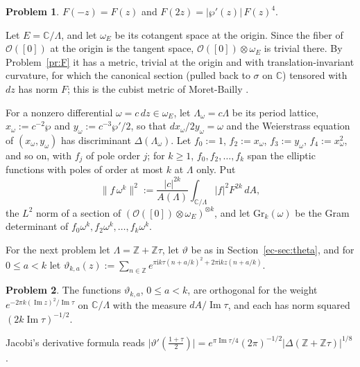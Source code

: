 \documentclass[reqno]{amsart}
\theoremstyle{definition}
\newtheorem{problem}{Problem}[section]
\theoremstyle{plain}
\newcommand{\Z}{\mathbb{Z}}
\newcommand{\C}{\mathbb{C}}
\newcommand{\Oc}{\mathcal{O}}
\newcommand{\ii}{\mathrm{i}}
\begin{document}
\begin{problem}\label{pr:F-dup}
\(F(-z) = F(z)\) and \(F(2z) = \lvert\wp'(z)\rvert\, F(z)^4\).
\end{problem}

Let \(E = \C/\Lambda\), and let \(\omega_E\) be its cotangent space at the origin.  Since the fiber of \(\Oc([0])\) at the origin is the tangent space, \(\Oc([0]) \otimes \omega_E\) is trivial there.  By Problem~\ref{pr:F} it has a metric, trivial at the origin and with translation-invariant curvature, for which the canonical section (pulled back to \(\sigma\) on \(\C\)) tensored with \(dz\) has norm \(F\); this is the cubist metric of Moret-Bailly \cite{MB85}.

For a nonzero differential \(\omega = c\,dz \in \omega_E\), let \(\Lambda_\omega = c\Lambda\) be its period lattice, \(x_\omega := c^{-2}\wp\) and \(y_\omega := c^{-3}\wp'/2\), so that \(dx_\omega/2y_\omega = \omega\) and the Weierstrass equation of \((x_\omega, y_\omega)\) has discriminant \(\Delta(\Lambda_\omega)\).  Let \(f_0 := 1\), \(f_2 := x_\omega\), \(f_3 := y_\omega\), \(f_4 := x_\omega^2\), and so on, with \(f_j\) of pole order \(j\); for \(k \ge 1\), \(f_0, f_2, \dots, f_k\) span the elliptic functions with poles of order at most \(k\) at \(\Lambda\) only.  Put
\[
  \lVert f\,\omega^{k} \rVert^2 := \frac{\lvert c \rvert^{2k}}{A(\Lambda)} \int_{\C/\Lambda} \lvert f \rvert^2 F^{2k} \, dA ,
\]
the \(L^2\) norm of a section of \((\Oc([0]) \otimes \omega_E)^{\otimes k}\), and let \(\mathrm{Gr}_k(\omega)\) be the Gram determinant of \(f_0\omega^k, f_2\omega^k, \dots, f_k\omega^k\).

For the next problem let \(\Lambda = \Z + \Z\tau\), let \(\vartheta\) be as in Section~\ref{ec-sec:theta}, and for \(0 \le a < k\) let \(\vartheta_{k,a}(z) := \sum_{n \in \Z} e^{\pi\ii k\tau(n + a/k)^2 + 2\pi\ii k z(n + a/k)}\).

\begin{problem}\label{pr:theta-norm}
The functions \(\vartheta_{k,a}\), \(0 \le a < k\), are orthogonal for the weight \(e^{-2\pi k (\operatorname{Im} z)^2/\operatorname{Im}\tau}\) on \(\C/\Lambda\) with the measure \(dA/\operatorname{Im}\tau\), and each has norm squared \((2k\operatorname{Im}\tau)^{-1/2}\).
\end{problem}

Jacobi's derivative formula reads \(\lvert \vartheta'(\tfrac{1+\tau}{2}) \rvert = e^{\pi\operatorname{Im}\tau/4} (2\pi)^{-1/2} \lvert \Delta(\Z + \Z\tau) \rvert^{1/8}\) \cite[Ch.~I, \S\S13--14]{MuT}.
\end{document}
